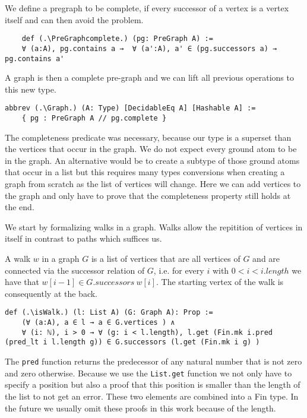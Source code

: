We define a pregraph to be complete, if every successor of a vertex is a vertex itself and can then avoid the problem.

\begin{lstlisting}
    def (.\PreGraphcomplete.) (pg: PreGraph A) := 
    ∀ (a:A), pg.contains a →  ∀ (a':A), a' ∈ (pg.successors a) → pg.contains a'
\end{lstlisting}

A graph is then a complete pre-graph and we can lift all previous operations to this new type.
\begin{lstlisting}
abbrev (.\Graph.) (A: Type) [DecidableEq A] [Hashable A] := 
    { pg : PreGraph A // pg.complete }
\end{lstlisting}

The completeness predicate was necessary, because our type is a superset than the vertices that occur in the graph. We do not expect every ground atom to be in the graph. An alternative would be to create a subtype of those ground atoms that occur in a list but this requires many types conversions when creating a graph from scratch as the list of vertices will change. Here we can add vertices to the graph and only have to prove that the completeness property still holds at the end.

We start by formalizing walks in a graph. Walks allow the repitition of vertices in itself in contrast to paths which suffices us.

A walk $w$ in a graph $G$ is a list of vertices that are all vertices of $G$ and are connected via the successor relation of $G$, i.e. for every $i$ with $0 < i < i.length$ we have that $w[i-1] \in G.successors\ w[i]$. The starting vertex of the walk is consequently at the back.

\begin{lstlisting}
def (.\isWalk.) (l: List A) (G: Graph A): Prop :=
    (∀ (a:A), a ∈ l → a ∈ G.vertices ) ∧ 
    ∀ (i: ℕ), i > 0 → ∀ (g: i < l.length), l.get (Fin.mk i.pred (pred_lt i l.length g)) ∈ G.successors (l.get (Fin.mk i g) )
\end{lstlisting}

The \lstinline|pred| function returns the predecessor of any natural number that is not zero and zero otherwise. Because we use the \lstinline|List.get| function we not only have to specify a position but also a proof that this position is smaller than the length of the list to not get an error. These two elements are combined into a Fin type. In the future we usually omit these proofs in this work because of the length.

